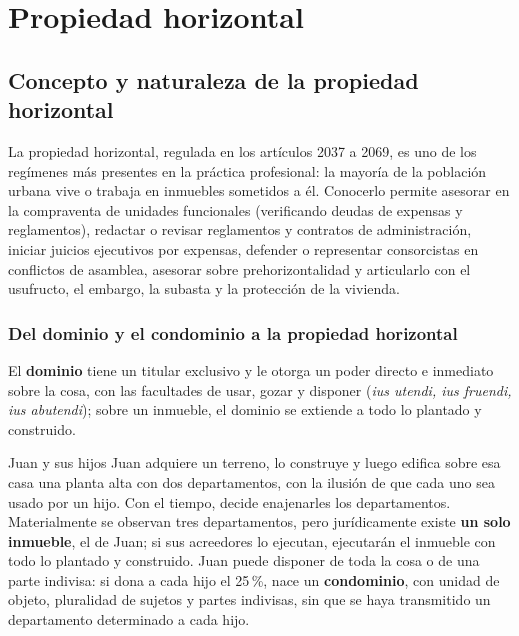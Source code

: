 \documentclass[12pt,oneside]{book}
\begin{document}
\part{Propiedad horizontal}

\chapter[Concepto y naturaleza de la propiedad horizontal]{Concepto y naturaleza de la propiedad horizontal}\label{cap:ph}

La propiedad horizontal, regulada en los artículos 2037 a 2069, es uno de los regímenes más presentes en la práctica profesional: la mayoría de la población urbana vive o trabaja en inmuebles sometidos a él. Conocerlo permite asesorar en la compraventa de unidades funcionales (verificando deudas de expensas y reglamentos), redactar o revisar reglamentos y contratos de administración, iniciar juicios ejecutivos por expensas, defender o representar consorcistas en conflictos de asamblea, asesorar sobre prehorizontalidad y articularlo con el usufructo, el embargo, la subasta y la protección de la vivienda.

\section{Del dominio y el condominio a la propiedad horizontal}

El \textbf{dominio} tiene un titular exclusivo y le otorga un poder directo e inmediato sobre la cosa, con las facultades de usar, gozar y disponer (\textit{ius utendi, ius fruendi, ius abutendi}); sobre un inmueble, el dominio se extiende a todo lo plantado y construido.

\begin{ejemplo}{Juan y sus hijos}
Juan adquiere un terreno, lo construye y luego edifica sobre esa casa una planta alta con dos departamentos, con la ilusión de que cada uno sea usado por un hijo. Con el tiempo, decide enajenarles los departamentos. Materialmente se observan tres departamentos, pero jurídicamente existe \textbf{un solo inmueble}, el de Juan; si sus acreedores lo ejecutan, ejecutarán el inmueble con todo lo plantado y construido. Juan puede disponer de toda la cosa o de una parte indivisa: si dona a cada hijo el 25\,\%, nace un \textbf{condominio}, con unidad de objeto, pluralidad de sujetos y partes indivisas, sin que se haya transmitido un departamento determinado a cada hijo.
\end{ejemplo}
\end{document}
